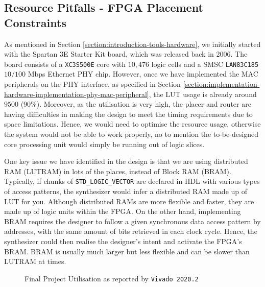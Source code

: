 \documentclass[a4paper]{report}
\newcommand{\code}{\texttt}
\begin{document}
\subsection{Resource Pitfalls - FPGA Placement Constraints}

As mentioned in Section \ref{section:introduction-tools-hardware}, we initially started with the Spartan 3E Starter Kit board, which was released back in 2006. The board consists of a \code{XC3S500E} core with $10,476$ logic cells \cite{xilinx-documentation-2011-core} and a SMSC \code{LAN83C185} $10/100$ Mbps Ethernet PHY chip. However, once we have implemented the MAC peripherals on the PHY interface, as specified in Section \ref{section:implementation-hardware-implementation-phy-mac-peripheral}, the LUT usage is already around $9500$ ($90\%$). Moreover, as the utilisation is very high, the placer and router are having difficulties in making the design to meet the timing requirements due to space limitations. Hence, we would need to optimise the resource usage, otherwise the system would not be able to work properly, no to mention the to-be-designed core processing unit would simply be running out of logic slices. 

One key issue we have identified in the design is that we are using distributed RAM (LUTRAM) in lots of the places, instead of Block RAM (BRAM). Typically, if chunks of \code{STD\_LOGIC\_VECTOR} are declared in HDL with various types of access patterns, the synthesizer would infer a distributed RAM made up of LUT for you. Although distributed RAMs are more flexible and faster, they are made up of logic units within the FPGA. On the other hand, implementing BRAM requires the designer to follow a given synchronous data access pattern by addresses, with the same amount of bits retrieved in each clock cycle. Hence, the synthesizer could then realise the designer's intent and activate the FPGA's BRAM. BRAM is usually much larger but less flexible and can be slower than LUTRAM at times. 

\begin{figure}[h!]
  \caption{Final Project Utilisation as reported by \code{Vivado 2020.2}}
  \label{fig:utilisation-fpga}
\end{figure}
\end{document}
